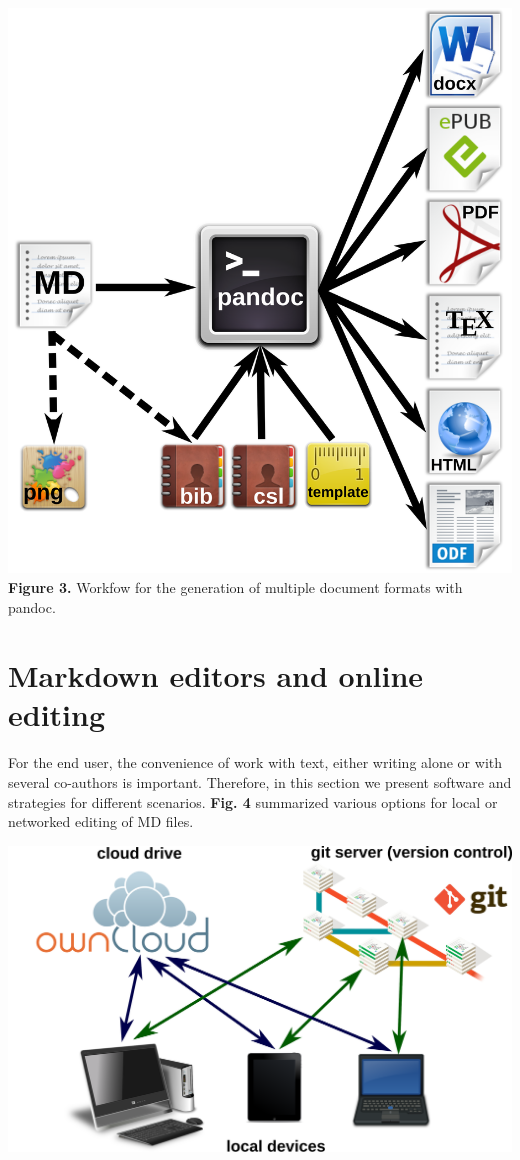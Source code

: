 \documentclass[10pt,fleqn]{wlpeerj}
\begin{document}
\includegraphics{fig-pandoc-workflow.png}
\textbf{Figure
3.}
Workfow
for
the
generation
of
multiple
document
formats
with
pandoc.

\section{Markdown
editors
and
online
editing}\label{markdown-editors-and-online-editing}

For
the
end
user,
the
convenience
of
work
with
text,
either
writing
alone
or
with
several
co-authors
is
important.
Therefore,
in
this
section
we
present
software
and
strategies
for
different
scenarios.
\textbf{Fig.
4}
summarized
various
options
for
local
or
networked
editing
of MD
files.

\includegraphics{fig-editing-options.png}
\end{document}
